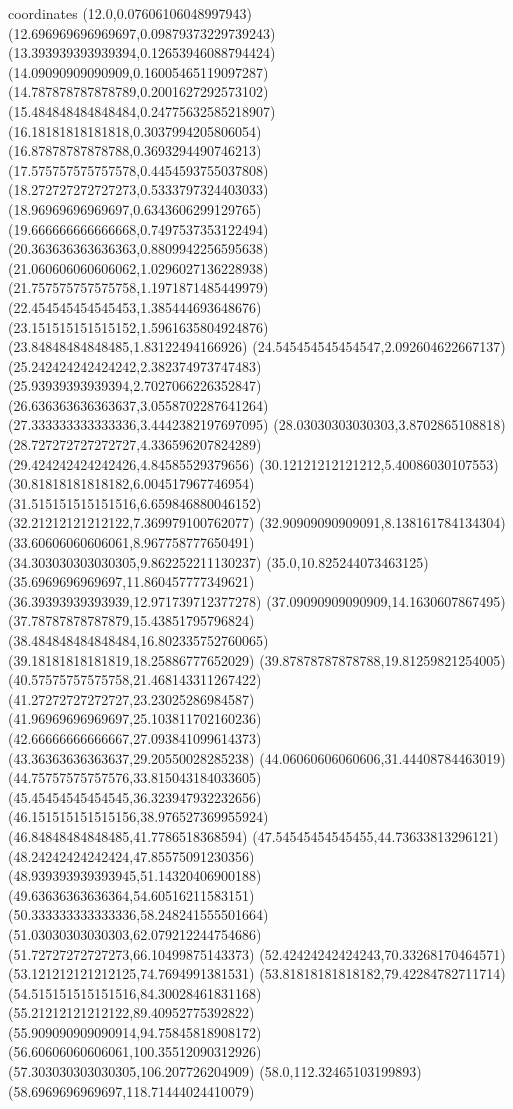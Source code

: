 coordinates {%
(12.0,0.07606106048997943)
(12.696969696969697,0.09879373229739243)
(13.393939393939394,0.12653946088794424)
(14.09090909090909,0.16005465119097287)
(14.787878787878789,0.2001627292573102)
(15.484848484848484,0.24775632585218907)
(16.18181818181818,0.3037994205806054)
(16.87878787878788,0.3693294490746213)
(17.575757575757578,0.4454593755037808)
(18.272727272727273,0.5333797324403033)
(18.96969696969697,0.6343606299129765)
(19.666666666666668,0.7497537353122494)
(20.363636363636363,0.8809942256595638)
(21.060606060606062,1.0296027136228938)
(21.757575757575758,1.1971871485449979)
(22.454545454545453,1.385444693648676)
(23.151515151515152,1.5961635804924876)
(23.84848484848485,1.83122494166926)
(24.545454545454547,2.092604622667137)
(25.242424242424242,2.382374973747483)
(25.93939393939394,2.7027066226352847)
(26.636363636363637,3.0558702287641264)
(27.333333333333336,3.4442382197697095)
(28.03030303030303,3.8702865108818)
(28.727272727272727,4.336596207824289)
(29.424242424242426,4.84585529379656)
(30.12121212121212,5.40086030107553)
(30.81818181818182,6.004517967746954)
(31.515151515151516,6.659846880046152)
(32.21212121212122,7.369979100762077)
(32.90909090909091,8.138161784134304)
(33.60606060606061,8.967758777650491)
(34.303030303030305,9.862252211130237)
(35.0,10.825244073463125)
(35.6969696969697,11.860457777349621)
(36.39393939393939,12.971739712377278)
(37.09090909090909,14.1630607867495)
(37.78787878787879,15.43851795796824)
(38.484848484848484,16.802335752760065)
(39.18181818181819,18.25886777652029)
(39.87878787878788,19.81259821254005)
(40.57575757575758,21.468143311267422)
(41.27272727272727,23.23025286984587)
(41.96969696969697,25.103811702160236)
(42.66666666666667,27.093841099614373)
(43.36363636363637,29.20550028285238)
(44.06060606060606,31.44408784463019)
(44.75757575757576,33.815043184033605)
(45.45454545454545,36.323947932232656)
(46.151515151515156,38.976527369955924)
(46.84848484848485,41.7786518368594)
(47.54545454545455,44.73633813296121)
(48.24242424242424,47.85575091230356)
(48.939393939393945,51.14320406900188)
(49.63636363636364,54.60516211583151)
(50.333333333333336,58.248241555501664)
(51.03030303030303,62.079212244754686)
(51.72727272727273,66.10499875143373)
(52.42424242424243,70.33268170464571)
(53.121212121212125,74.7694991381531)
(53.81818181818182,79.42284782711714)
(54.515151515151516,84.30028461831168)
(55.21212121212122,89.40952775392822)
(55.909090909090914,94.75845818908172)
(56.60606060606061,100.35512090312926)
(57.303030303030305,106.207726204909)
(58.0,112.32465103199893)
(58.6969696969697,118.71444024410079)
}
